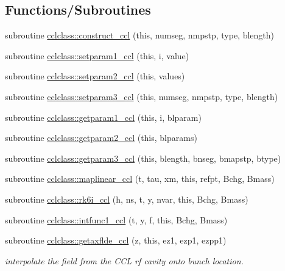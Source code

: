 \subsection*{Functions/\+Subroutines}
\begin{DoxyCompactItemize}
\item 
subroutine \mbox{\hyperlink{namespacecclclass_af38d062f04c18827d1d2a76c17039c58}{cclclass\+::construct\+\_\+ccl}} (this, numseg, nmpstp, type, blength)
\item 
subroutine \mbox{\hyperlink{namespacecclclass_adf1829da601e1090ce5f5e5046c4d62c}{cclclass\+::setparam1\+\_\+ccl}} (this, i, value)
\item 
subroutine \mbox{\hyperlink{namespacecclclass_a7bc5a807438db526489d8773fa168375}{cclclass\+::setparam2\+\_\+ccl}} (this, values)
\item 
subroutine \mbox{\hyperlink{namespacecclclass_a5a90756fe0684d2f29121a368dbef489}{cclclass\+::setparam3\+\_\+ccl}} (this, numseg, nmpstp, type, blength)
\item 
subroutine \mbox{\hyperlink{namespacecclclass_a3cb17684a6eef64dd3c35cbb03bcb8b3}{cclclass\+::getparam1\+\_\+ccl}} (this, i, blparam)
\item 
subroutine \mbox{\hyperlink{namespacecclclass_ad1c56a9447d1ff854afdc5502ae0fe18}{cclclass\+::getparam2\+\_\+ccl}} (this, blparams)
\item 
subroutine \mbox{\hyperlink{namespacecclclass_ad223096667fbe2e53bae56b52b2350fa}{cclclass\+::getparam3\+\_\+ccl}} (this, blength, bnseg, bmapstp, btype)
\item 
subroutine \mbox{\hyperlink{namespacecclclass_a2efbf5186624893a0f213ca40968c198}{cclclass\+::maplinear\+\_\+ccl}} (t, tau, xm, this, refpt, Bchg, Bmass)
\item 
subroutine \mbox{\hyperlink{namespacecclclass_a6dd4075592b69b308b61e3ee2f065517}{cclclass\+::rk6i\+\_\+ccl}} (h, ns, t, y, nvar, this, Bchg, Bmass)
\item 
subroutine \mbox{\hyperlink{namespacecclclass_a09adb3ba980646f12eb22fddbd4c962d}{cclclass\+::intfunc1\+\_\+ccl}} (t, y, f, this, Bchg, Bmass)
\item 
subroutine \mbox{\hyperlink{namespacecclclass_a881db4a51cdc73a6c489b2814565a243}{cclclass\+::getaxflde\+\_\+ccl}} (z, this, ez1, ezp1, ezpp1)
\begin{DoxyCompactList}\small\item\em interpolate the field from the C\+CL rf cavity onto bunch location. \end{DoxyCompactList}\item 

\end{DoxyCompactItemize}
